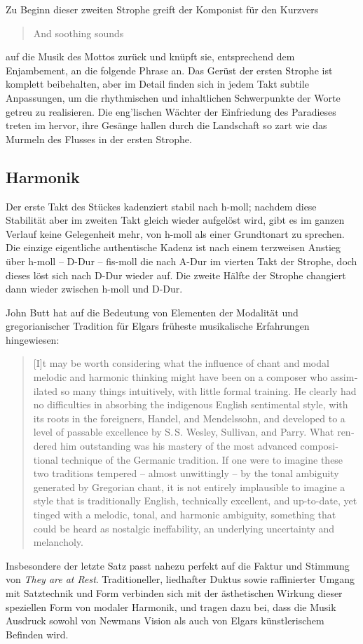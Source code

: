 \documentclass[a4paper,11pt,open=any]{scrbook}
\newcommand{\engquote}[1]{\foreignblockquote{english}{#1}}
\begin{document}
Zu Beginn dieser zweiten Strophe greift der Komponist für den Kurzvers
\engquote{And soothing sounds} auf die Musik des Mottos zurück und knüpft
sie, entsprechend dem Enjambement, an die folgende Phrase an.  Das Gerüst
der ersten Strophe ist komplett beibehalten, aber im Detail finden sich in
jedem Takt subtile Anpassungen, um die rhythmischen und inhaltlichen
Schwerpunkte der Worte getreu zu realisieren.  Die eng’lischen Wächter
der Einfriedung des Paradieses treten im  hervor, ihre
Gesänge hallen durch die Landschaft so zart wie das Murmeln des Flusses
in der ersten Strophe.

\subsection*{Harmonik}
Der erste Takt des Stückes kadenziert stabil nach h-moll; nachdem diese
Stabilität aber im zweiten Takt gleich wieder aufgelöst wird, gibt es im
ganzen Verlauf keine Gelegenheit mehr, von h-moll als einer Grundtonart
zu sprechen.  Die einzige eigentliche authentische Kadenz ist nach einem
terzweisen Anstieg über h-moll – D-Dur – fis-moll die nach A-Dur im vierten
Takt der Strophe, doch dieses löst sich nach D-Dur wieder auf.  Die zweite
Hälfte der Strophe changiert dann wieder zwischen h-moll und D-Dur.

John Butt hat auf die Bedeutung von Elementen der Modalität und gregorianischer
Tradition für Elgars früheste musikalische Erfahrungen hingewiesen:
\label{butt:1}\engquote{[I]t may be worth considering what the influence
of chant and modal melodic and harmonic thinking might have been on a
composer who assimilated so many things intuitively, with little formal
training.  He clearly had no difficulties in absorbing the indigenous
English sentimental style, with its roots in the foreigners, Handel, and
Mendelssohn, and developed to a level of passable excellence by S.\,S.
Wesley, Sullivan, and Parry.  What rendered him outstanding was his
mastery of the most advanced compositional technique of the Germanic
tradition.  If one were to imagine these two traditions tempered –
almost unwittingly – by the tonal ambiguity generated by Gregorian
chant, it is not entirely implausible to imagine a style that is
traditionally English, technically excellent, and up-to-date, yet
tinged with a melodic, tonal, and harmonic ambiguity, something that
could be heard as nostalgic ineffability, an underlying uncertainty
and melancholy.\cite[S.~107f.]{butt-rcath}}
Insbesondere der letzte Satz passt nahezu perfekt auf die Faktur und Stimmung
von \textit{They are at Rest}.  Traditioneller, liedhafter Duktus sowie
raffinierter Umgang mit Satztechnik und Form verbinden sich mit der
ästhetischen Wirkung dieser speziellen Form von modaler Harmonik, und
tragen dazu bei, dass die Musik Ausdruck sowohl von Newmans Vision als
auch von Elgars künstlerischem Befinden wird.
\end{document}
